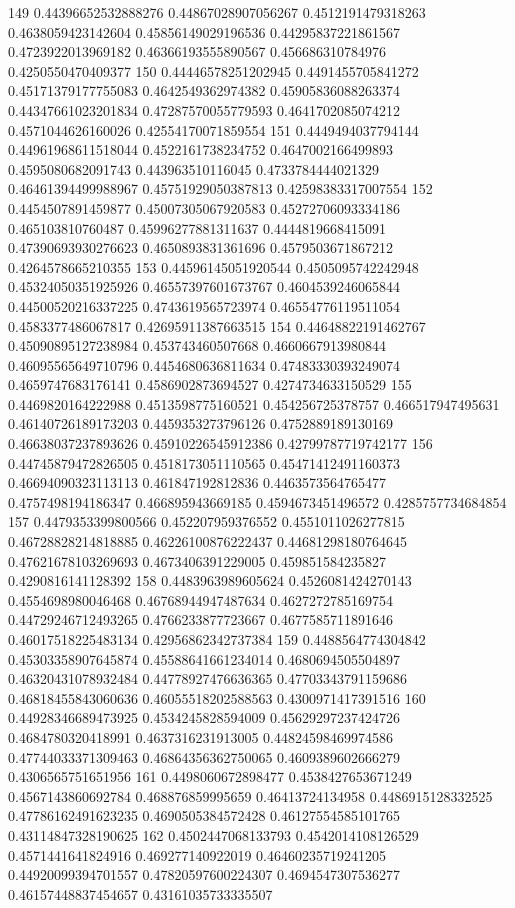 149 0.44396652532888276 0.44867028907056267 0.4512191479318263 0.4638059423142604 0.45856149029196536 0.44295837221861567 0.4723922013969182 0.46366193555890567 0.456686310784976 0.4250550470409377
150 0.44446578251202945 0.4491455705841272 0.45171379177755083 0.4642549362974382 0.45905836088263374 0.44347661023201834 0.47287570055779593 0.4641702085074212 0.4571044626160026 0.42554170071859554
151 0.4449494037794144 0.44961968611518044 0.4522161738234752 0.4647002166499893 0.4595080682091743 0.443963510116045 0.4733784444021329 0.46461394499988967 0.45751929050387813 0.42598383317007554
152 0.4454507891459877 0.45007305067920583 0.45272706093334186 0.465103810760487 0.45996277881311637 0.4444819668415091 0.47390693930276623 0.4650893831361696 0.4579503671867212 0.4264578665210355
153 0.44596145051920544 0.4505095742242948 0.45324050351925926 0.46557397601673767 0.4604539246065844 0.44500520216337225 0.4743619565723974 0.46554776119511054 0.4583377486067817 0.42695911387663515
154 0.44648822191462767 0.45090895127238984 0.453743460507668 0.4660667913980844 0.46095565649710796 0.4454680636811634 0.47483330393249074 0.4659747683176141 0.4586902873694527 0.4274734633150529
155 0.4469820164222988 0.4513598775160521 0.454256725378757 0.466517947495631 0.46140726189173203 0.4459353273796126 0.4752889189130169 0.46638037237893626 0.45910226545912386 0.42799787719742177
156 0.44745879472826505 0.4518173051110565 0.45471412491160373 0.46694090323113113 0.461847192812836 0.4463573564765477 0.4757498194186347 0.466895943669185 0.4594673451496572 0.4285757734684854
157 0.4479353399800566 0.452207959376552 0.4551011026277815 0.46728828214818885 0.46226100876222437 0.44681298180764645 0.47621678103269693 0.4673406391229005 0.459851584235827 0.4290816141128392
158 0.4483963989605624 0.4526081424270143 0.4554698980046468 0.46768944947487634 0.4627272785169754 0.44729246712493265 0.4766233877723667 0.4677585711891646 0.46017518225483134 0.42956862342737384
159 0.4488564774304842 0.45303358907645874 0.45588641661234014 0.4680694505504897 0.46320431078932484 0.44778927476636365 0.47703343791159686 0.46818455843060636 0.46055518202588563 0.4300971417391516
160 0.44928346689473925 0.4534245828594009 0.45629297237424726 0.4684780320418991 0.4637316231913005 0.44824598469974586 0.47744033371309463 0.46864356362750065 0.4609389602666279 0.4306565751651956
161 0.4498060672898477 0.4538427653671249 0.4567143860692784 0.468876859995659 0.46413724134958 0.4486915128332525 0.47786162491623235 0.4690505384572428 0.46127554585101765 0.43114847328190625
162 0.4502447068133793 0.4542014108126529 0.4571441641824916 0.469277140922019 0.46460235719241205 0.44920099394701557 0.47820597600224307 0.4694547307536277 0.46157448837454657 0.43161035733335507
